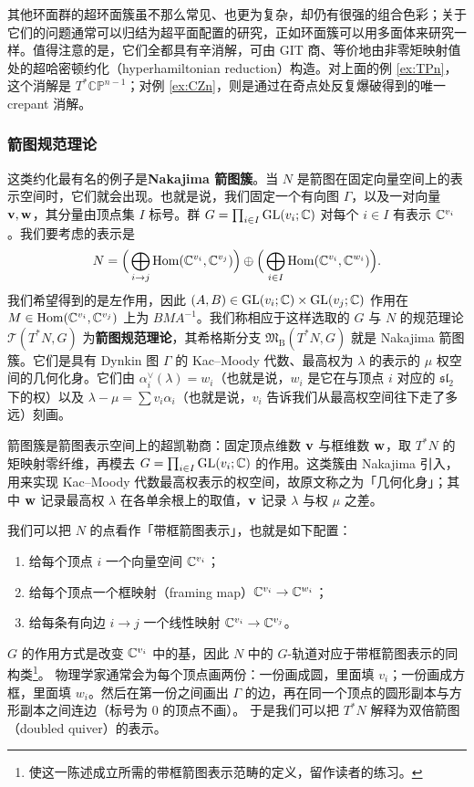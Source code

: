 其他环面群的超环面簇虽不那么常见、也更为复杂，却仍有很强的组合色彩；关于它们的问题通常可以归结为超平面配置的研究，正如环面簇可以用多面体来研究一样。值得注意的是，它们全都具有辛消解，可由 GIT 商、等价地由非零矩映射值处的超哈密顿约化（hyperhamiltonian reduction）构造。对上面的例 \ref{ex:TPn}，这个消解是 $T^*\mathbb{CP}^{n-1}$；对例 \ref{ex:CZn}，则是通过在奇点处反复爆破得到的唯一 crepant 消解。

\subsubsection{箭图规范理论}

这类约化最有名的例子是{\bf Nakajima 箭图簇}。当 $N$ 是箭图在固定向量空间上的表示空间时，它们就会出现。也就是说，我们固定一个有向图 $\Gamma$，以及一对向量 $\mathbf{v},\mathbf{w}$，其分量由顶点集 $I$ 标号。群 $G=\prod_{i\in I} \operatorname{GL}(v_i;\mathbb{C})$ 对每个 $i\in I$ 有表示 $\mathbb{C}^{v_i}$。我们要考虑的表示是
\[N= \Big(\bigoplus_{i\to j}\operatorname{Hom}(\mathbb{C}^{v_i},\mathbb{C}^{v_j})\Big)\oplus \Big(\bigoplus_{i\in I} \operatorname{Hom}(\mathbb{C}^{v_i},\mathbb{C}^{w_i})\Big).\]
我们希望得到的是左作用，因此 $(A,B)\in \operatorname{GL}(v_i;\mathbb{C})\times \operatorname{GL}(v_j;\mathbb{C})$ 作用在 $M\in \operatorname{Hom}(\mathbb{C}^{v_i},\mathbb{C}^{v_j})$ 上为 $BMA^{-1}$。我们称相应于这样选取的 $G$ 与 $N$ 的规范理论 $\mathcal{T}(T^*N,G)$ 为{\bf 箭图规范理论}，其希格斯分支 $\mathfrak{M}_{\operatorname{B}}(T^*N,G)$ 就是 Nakajima 箭图簇。它们是具有 Dynkin 图 $\Gamma$ 的 Kac--Moody 代数、最高权为 $\lambda$ 的表示的 $\mu$ 权空间的几何化身。它们由 $\alpha_i^{\vee}(\lambda)=w_i$（也就是说，$w_i$ 是它在与顶点 $i$ 对应的 $\mathfrak{sl}_2$ 下的权）以及 $\lambda-\mu=\sum v_i\alpha_i$（也就是说，$v_i$ 告诉我们从最高权空间往下走了多远）刻画。
\begin{yizhu}
箭图簇是箭图表示空间上的超凯勒商：固定顶点维数 $\mathbf{v}$ 与框维数 $\mathbf{w}$，取 $T^*N$ 的矩映射零纤维，再模去 $G=\prod_{i\in I}\operatorname{GL}(v_i;\mathbb{C})$ 的作用。这类簇由 Nakajima 引入，用来实现 Kac--Moody 代数最高权表示的权空间，故原文称之为「几何化身」；其中 $\mathbf{w}$ 记录最高权 $\lambda$ 在各单余根上的取值，$\mathbf{v}$ 记录 $\lambda$ 与权 $\mu$ 之差。
\end{yizhu}

我们可以把 $N$ 的点看作「带框箭图表示」，也就是如下配置：
\begin{enumerate}
    \item 给每个顶点 $i$ 一个向量空间 $\mathbb{C}^{v_i}$；
    \item 给每个顶点一个框映射（framing map）$\mathbb{C}^{v_i}\to \mathbb{C}^{w_i}$；
    \item 给每条有向边 $i\to j$ 一个线性映射 $\mathbb{C}^{v_i} \to \mathbb{C}^{v_j}$。
\end{enumerate}  
$G$ 的作用方式是改变 $\mathbb{C}^{v_i}$ 中的基，因此 $N$ 中的 $G$-轨道对应于带框箭图表示的同构类\footnote{使这一陈述成立所需的带框箭图表示范畴的定义，留作读者的练习。}。
物理学家通常会为每个顶点画两份：一份画成圆，里面填 $v_i$；一份画成方框，里面填 $w_i$。然后在第一份之间画出 $\Gamma$ 的边，再在同一个顶点的圆形副本与方形副本之间连边（标号为 0 的顶点不画）。
于是我们可以把 $T^*N$ 解释为双倍箭图（doubled quiver）的表示。

